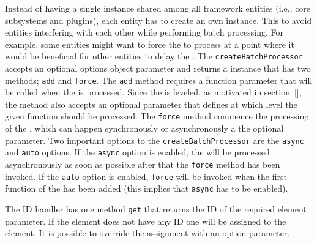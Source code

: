 \documentclass[a4paper,11pt]{kth-mag}
\newcommand{\code}[1]{\texttt{#1}}
\newcommand\abbr[2][]{\uppercase{#2}\ifthenelse{\equal{#1}{}}%
                     {}{#1}}
\begin{document}
          Instead of having a single  instance shared among all framework entities (i.e., core subsystems and plugins), each entity has to create an own instance.
          This to avoid entities interfering with each other while performing \gls{batch processing}.
          For example, some entities might want to force the  to process at a point where it would be beneficial for other entities to delay the .
          The \code{createBatchProcessor} accepts an optional options object parameter and returns a  instance that has two methods; \code{add} and \code{force}.
          The \code{add} method requires a function parameter that will be called when the  is processed.
          Since the  is leveled, as motivated in section~\ref{}, the method also accepts an optional parameter that defines at which level the given function should be processed.
          The \code{force} method commence the processing of the , which can happen synchronously or asynchronously a the optional parameter.
          Two important options to the \code{createBatchProcessor} are the \code{async} and \code{auto} options.
          If the \code{async} option is enabled, the  will be processed asynchronously as soon as possible after that the \code{force} method has been invoked.
          If the \code{auto} option is enabled, \code{force} will be invoked when the first function of the  has been added (this implies that \code{async} has to be enabled).

          The \abbr{ID} handler has one method \code{get} that returns the \abbr{ID} of the required element parameter.
          If the element does not have any \abbr{ID} one will be assigned to the element.
          It is possible to override the assignment with an option parameter.


\end{document}
